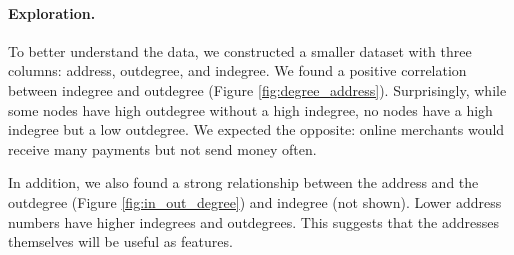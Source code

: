 \documentclass{article} %
\begin{document}
\paragraph{Exploration.} To better understand the data, we constructed a smaller dataset with three columns: address, outdegree, and indegree. We found a positive correlation between indegree and outdegree (Figure \ref{fig:degree_address}). Surprisingly, while some nodes have high outdegree without a high indegree, no nodes have a high indegree but a low outdegree. We expected the opposite: online merchants would receive many payments but not send money often.

In addition, we also found a strong relationship between the address and the outdegree (Figure \ref{fig:in_out_degree}) and indegree (not shown). Lower address numbers have higher indegrees and outdegrees. This suggests that the addresses themselves will be useful as features.
\end{document}

